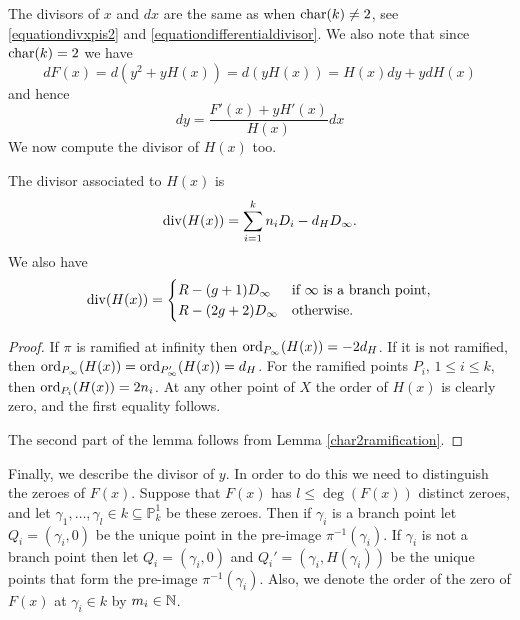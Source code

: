 The divisors of $x$ and $dx$ are the same as when $\operatorname{char}(k) \neq 2$, see \eqref{equationdivxpis2} and \eqref{equationdifferentialdivisor}.
We also note that since $\operatorname{char}(k) = 2$ we have
    \[
    dF(x) = d(y^2 + yH(x)) = d(yH(x)) = H(x)dy + ydH(x)
    \]
    and hence
    \begin{equation}\label{equationdivisorofdypis2}
    dy = \frac{F'(x) + yH'(x)}{H(x)}dx
    \end{equation}
We now compute the divisor of $H(x)$ too.



    \begin{lem}\label{h(x)char2}
    The divisor associated to $H(x)$ is
        \[
        \operatorname{div} (H(x)) = \sum_{i=1}^k n_i D_i - d_HD_\infty.
        \]
    We also have
        \begin{equation*}
        \operatorname{div}(H(x)) = 
            \begin{cases}
            R - (g+1)D_\infty & \text{if}\ \infty \ \text{is a branch point,}\\
            R - (2g+2)D_\infty &  \text{otherwise.}
        \end{cases}
        \end{equation*}
    \end{lem}
    \begin{proof}
    If $\pi$ is ramified at infinity then $\operatorname{ord}_{P_{\infty}}(H(x)) = - 2d_H$.
    If it is not ramified, then $\operatorname{ord}_{P_{\infty}}(H(x)) = \operatorname{ord}_{P_{\infty}'}(H(x))=d_H$.
    For the ramified points $P_i$, $1\leq i \leq k$, then $ \operatorname{ord}_{P_i}(H(x))= 2n_i$.
    At any other point of $X$ the order of $H(x)$ is clearly zero, and the first equality follows.

    The second part of the lemma follows from Lemma \ref{char2ramification}.
    \end{proof}
    
Finally, we describe the divisor of $y$.
In order to do this we need to distinguish the zeroes of $F(x)$.
Suppose that $F(x)$ has $l \leq \deg(F(x))$ distinct zeroes, and let $\gamma_1, \ldots, \gamma_l \in k \subseteq \mathbb P_k^1$ be these zeroes.
Then if $\gamma_i$ is a branch point let $Q_i = (\gamma_i, 0)$ be the unique point in the pre-image $\pi^{-1}(\gamma_i)$.
If $\gamma_i$ is not a branch point then let $Q_i = (\gamma_i, 0)$ and $Q_i' = (\gamma_i, H(\gamma_i))$ be the unique points that form the pre-image $\pi^{-1}(\gamma_i)$.
Also, we denote the order of the zero of $F(x)$ at $\gamma_i \in k$ by $m_i \in {\mathbb N}$.


